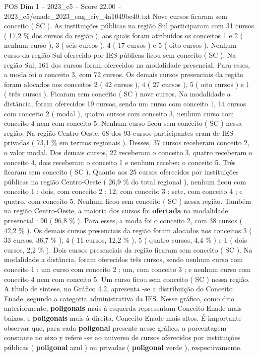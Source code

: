 \begin{textsample}{POS Dim 1 – 2023\_c5 – Score 22.00 – 2023\_c5/enade\_2023\_eng\_civ\_4a1049be40.txt}
Nove cursos ficaram sem conceito ( SC ).
As instituições públicas na região Sul participaram com 31 cursos ( 17,2 \% dos cursos da região ), aos quais foram atribuídos os conceitos 1 e 2 ( nenhum curso ), 3 ( seis cursos ), 4 ( 17 cursos ) e 5 ( oito cursos ).
Nenhum curso da região Sul oferecido por IES públicas ficou sem conceito ( SC ).
Na região Sul, 161 dos cursos foram oferecidos na modalidade presencial.
Para esses, a moda foi o conceito 3, com 72 cursos.
Os demais cursos presenciais da região foram alocados nos conceitos 2 ( 42 cursos ), 4 ( 27 cursos ), 5 ( oito cursos ) e 1 ( três cursos ).
Ficaram sem conceito ( SC ) nove cursos.
Na modalidade a distância, foram oferecidos 19 cursos, sendo um curso com conceito 1, 14 cursos com conceito 2 ( modal ), quatro cursos com conceito 3, nenhum curso com conceito 4 nem com conceito 5.
Nenhum curso ficou sem conceito ( SC ) nessa região.
Na região Centro-Oeste, 68 dos 93 cursos participantes eram de IES privadas ( 73,1 \% em termos regionais ).
Desses, 37 cursos receberam conceito 2, o valor modal.
Dos demais cursos, 22 receberam o conceito 3, quatro receberam o conceito 4, dois receberam o conceito 1 e nenhum recebeu o conceito 5.
Três ficaram sem conceito ( SC ).
Quanto aos 25 cursos oferecidos por instituições públicas na região Centro-Oeste ( 26,9 \% do total regional ), nenhum ficou com conceito 1 ; dois, com conceito 2 ; 12, com conceito 3 ; sete, com conceito 4 ; e quatro, com conceito 5.
Nenhum ficou sem conceito ( SC ) nessa região.
Também na região Centro-Oeste, a maioria dos cursos foi \textbf{ofertada} na modalidade presencial : 90 ( 96,8 \% ).
Para esses, a moda foi o conceito 2, com 38 cursos ( 42,2 \% ).
Os demais cursos presenciais da região foram alocados nos conceitos 3 ( 33 cursos, 36,7 \% ), 4 ( 11 cursos, 12,2 \% ), 5 ( quatro cursos, 4,4 \% ) e 1 ( dois cursos, 2,2 \% ).
Dois cursos presenciais da região ficaram sem conceito ( SC ).
Na modalidade a distância, foram oferecidos três cursos, sendo nenhum curso com conceito 1 ; um curso com conceito 2 ; um, com conceito 3 ; e nenhum curso com conceito 4 nem com conceito 5.
Um curso ficou sem conceito ( SC ) nessa região.
A título de síntese, no Gráfico 4.2, apresenta -se a distribuição do Conceito Enade, segundo a categoria administrativa da IES.
Nesse gráfico, como dito anteriormente, \textbf{poligonais} mais à esquerda representam Conceito Enade mais baixos, e \textbf{poligonais} mais à direita, Conceito Enade mais altos.
É importante observar que, para cada \textbf{poligonal} presente nesse gráfico, a porcentagem constante no eixo y refere -se ao universo de cursos oferecidos por instituições públicas ( \textbf{poligonal} azul ) ou privadas ( \textbf{poligonal} verde ), respectivamente.

\end{textsample}
